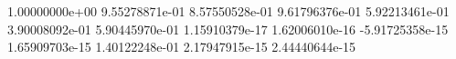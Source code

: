  1.00000000e+00
 9.55278871e-01
 8.57550528e-01
 9.61796376e-01
 5.92213461e-01
 3.90008092e-01
 5.90445970e-01
 1.15910379e-17
 1.62006010e-16
 -5.91725358e-15
 1.65909703e-15
 1.40122248e-01
 2.17947915e-15
 2.44440644e-15
